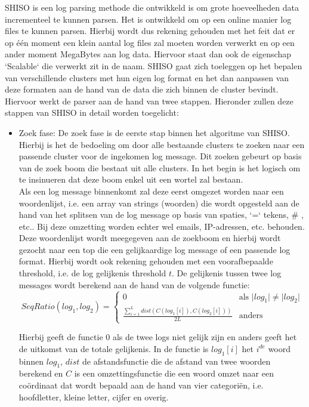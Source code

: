 SHISO is een log parsing methode die ontwikkeld is om grote hoeveelheden data incrementeel te kunnen parsen. Het is ontwikkeld om op een online manier log files te kunnen parsen. Hierbij wordt dus rekening gehouden met het feit dat er op één moment een klein aantal log files zal moeten worden verwerkt en op een ander moment MegaBytes aan log data. Hiervoor staat dan ook de eigenschap `Scalable` die verwerkt zit in de naam. SHISO gaat zich toeleggen op het bepalen van verschillende clusters met hun eigen log format en het dan aanpassen van deze formaten aan de hand van de data die zich binnen de cluster bevindt. Hiervoor werkt de parser aan de hand van twee stappen. Hieronder zullen deze stappen van SHISO in detail worden toegelicht: 
\begin{itemize}
    \item Zoek fase: De zoek fase is de eerste stap binnen het algoritme van SHISO. Hierbij is het de bedoeling om door alle bestaande clusters te zoeken naar een passende cluster voor de ingekomen log message. Dit zoeken gebeurt op basis van de zoek boom die bestaat uit alle clusters. In het begin is het logisch om te insinueren dat deze boom enkel uit een wortel zal bestaan.\\
    
    Als een log message binnenkomt zal deze eerst omgezet worden naar een woordenlijst, i.e. een array van strings (woorden) die wordt opgesteld aan de hand van het splitsen van de log message op basis van spaties, `=` tekens, \# , etc.. Bij deze omzetting worden echter wel emails, IP-adressen, etc. behouden. Deze woordenlijst wordt meegegeven aan de zoekboom en hierbij wordt gezocht naar een top die een gelijkaardige log message of een passende log format. Hierbij wordt ook rekening gehouden met een voorafbepaalde threshold, i.e. de log gelijkenis threshold $t$. De gelijkenis tussen twee log messages wordt berekend aan de hand van de volgende functie:\\
    \[SeqRatio(log_{1}, log_{2}) = \begin{cases}
        0 & \text{als } \lvert log_{1} \rvert \neq \lvert log_{2} \rvert\\
        \frac{\sum_{i=1}^{L} dist(C(log_{1}[i]), C(log_{2}[i]))}{2L} & \text{anders}
    \end{cases}\]
    
    Hierbij geeft de functie 0 als de twee logs niet gelijk zijn en anders geeft het de uitkomst van de totale gelijkenis. In de functie is $log_{1}[i]$ het $i^{de}$ woord binnen $log_{1}$, $dist$ de afstandsfunctie die de afstand van twee woorden berekend en $C$ is een omzettingsfunctie die een woord omzet naar een coördinaat dat wordt bepaald aan de hand van vier categoriën, i.e. hoofdletter, kleine letter, cijfer en overig.\\
    

\end{itemize}
